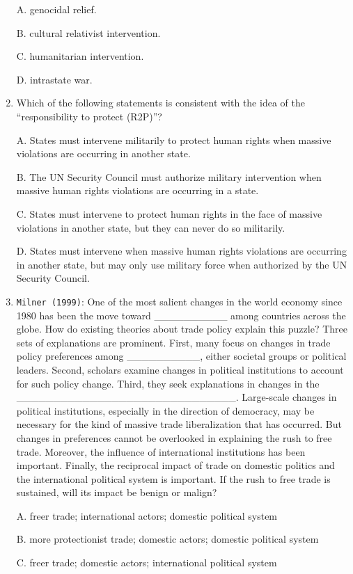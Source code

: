 \documentclass[
]{book}
\begin{document}
\begin{enumerate}
  A. genocidal relief.

  B. cultural relativist intervention.

  C. humanitarian intervention.

  D. intrastate war.
\item
  Which of the following statements is consistent with the idea of the ``responsibility to protect (R2P)''?

  A. States must intervene militarily to protect human rights when massive violations are occurring in another state.

  B. The UN Security Council must authorize military intervention when massive human rights violations are occurring in a state.

  C. States must intervene to protect human rights in the face of massive violations in another state, but they can never do so militarily.

  D. States must intervene when massive human rights violations are occurring in another state, but may only use military force when authorized by the UN Security Council.
\item
  \texttt{Milner\ (1999)}: One of the most salient changes in the world economy since 1980 has been the move toward \_\_\_\_\_\_\_\_\_\_ among countries across the globe. How do existing theories about trade policy explain this puzzle? Three sets of explanations are prominent. First, many focus on changes in trade policy preferences among \_\_\_\_\_\_\_\_\_\_, either societal groups or political leaders. Second, scholars examine changes in political institutions to account for such policy change. Third, they seek explanations in changes in the \_\_\_\_\_\_\_\_\_\_\_\_\_\_\_\_\_\_\_\_\_\_\_\_\_\_\_\_\_\_. Large-scale changes in political institutions, especially in the direction of democracy, may be necessary for the kind of massive trade liberalization that has occurred. But changes in preferences cannot be overlooked in explaining the rush to free trade. Moreover, the influence of international institutions has been important. Finally, the reciprocal impact of trade on domestic politics and the international political system is important. If the rush to free trade is sustained, will its impact be benign or malign?

  A. freer trade; international actors; domestic political system

  B. more protectionist trade; domestic actors; domestic political system

  C. freer trade; domestic actors; international political system


\end{enumerate}
\end{document}
